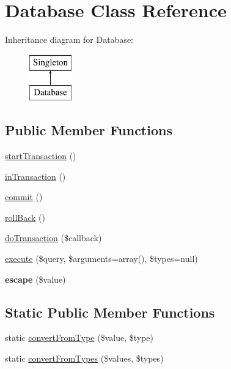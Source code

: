 \hypertarget{classDatabase}{
\section{Database Class Reference}
\label{classDatabase}
}
Inheritance diagram for Database:\begin{figure}[H]
\begin{center}
\leavevmode
\includegraphics[height=2.000000cm]{classDatabase}
\end{center}
\end{figure}
\subsection*{Public Member Functions}
\begin{DoxyCompactItemize}
\item 
\hyperlink{classDatabase_a4107b10d54447fc4be287c878ff6faa0}{startTransaction} ()
\item 
\hyperlink{classDatabase_a8eb4ff36e5aee14fea7e1956b53dea9d}{inTransaction} ()
\item 
\hyperlink{classDatabase_a2903b6c9ff18c27ce43fb79558bbcfee}{commit} ()
\item 
\hyperlink{classDatabase_af41c84a1d533c8c650322e128112df34}{rollBack} ()
\item 
\hyperlink{classDatabase_a3ac67d2c28767d5c6d66db12d3568d7c}{doTransaction} (\$callback)
\item 
\hyperlink{classDatabase_a1a7d690c71fa3e350cb69fa33e7a8995}{execute} (\$query, \$arguments=array(), \$types=null)
\item 
\hypertarget{classDatabase_a49c18a3525e0ecfe4eb6727be719e0b3}{
{\bfseries escape} (\$value)}
\label{classDatabase_a49c18a3525e0ecfe4eb6727be719e0b3}

\end{DoxyCompactItemize}
\subsection*{Static Public Member Functions}
\begin{DoxyCompactItemize}
\item 
static \hyperlink{classDatabase_a1cb4660e6675325f9ede20652ec4453d}{convertFromType} (\$value, \$type)
\item 
static \hyperlink{classDatabase_a2c45ff0539c569218940280fb4b6239d}{convertFromTypes} (\$values, \$types)
\end{DoxyCompactItemize}
